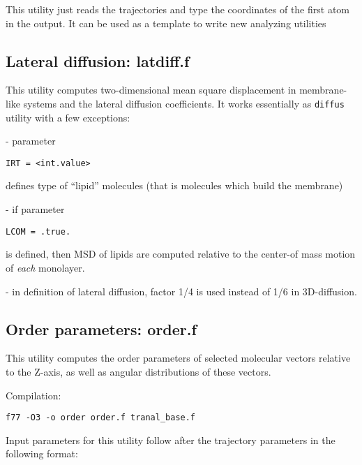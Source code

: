 \documentclass{article}
\begin{document}
This utility just reads the trajectories and type the coordinates of the first 
atom in the output. It can be used as a template to write new analyzing 
utilities

\subsection{Lateral diffusion: latdiff.f}

This utility computes two-dimensional mean square displacement in
membrane-like systems and the lateral diffusion coefficients. It works
essentially as \verb|diffus| utility with a few exceptions:

- parameter

\verb|IRT = <int.value>|

defines type of ``lipid'' molecules (that is molecules which build the 
membrane)

- if parameter

\verb|LCOM = .true.|

is defined, then MSD of lipids are computed relative to the center-of mass
motion of {\it each} monolayer. 

- in definition of lateral diffusion, factor 1/4 is used 
instead of 1/6 in 3D-diffusion.

\subsection{Order parameters: order.f}

This utility computes the order parameters of selected molecular vectors 
relative to the Z-axis, as well as angular distributions of these vectors.

Compilation:

\verb|f77 -O3 -o order order.f tranal_base.f|

Input parameters for this utility follow after the trajectory parameters
in the following format:
\end{document}
